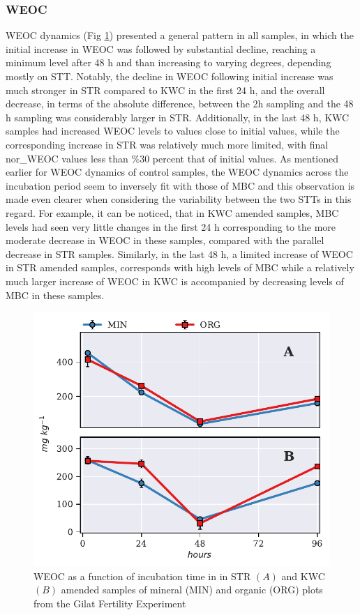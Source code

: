 		\subsubsection{WEOC}
			WEOC dynamics (Fig \ref{fig:weoc_treated_preliminary}) presented a general pattern in all samples, in which the initial increase in WEOC was followed by substantial decline, reaching a minimum level after 48 h and than increasing to varying degrees, depending mostly on STT.  Notably, the decline in WEOC following initial increase was much stronger in STR compared to KWC in the first 24 h, and the overall decrease, in terms of the absolute difference, between the 2h sampling and the 48 h sampling was considerably larger in STR. Additionally, in the last 48 h, KWC samples had increased WEOC levels to values close to initial values, while the corresponding increase in STR was relatively much more limited, with final nor\_WEOC values less than \%30 percent that of initial values. As mentioned earlier for WEOC dynamics of control samples, the WEOC dynamics across the incubation period seem to inversely fit with those of MBC and this observation is made even clearer when considering the variability between the two STTs in this regard. For example, it can be noticed, that in KWC amended samples, MBC levels had seen very little changes in the first 24 h corresponding to the more moderate decrease in WEOC in these samples, compared with the parallel  decrease in STR samples. Similarly, in the last 48 h, a limited increase of WEOC in STR amended samples, corresponds with high levels of MBC while a relatively much larger increase of WEOC in KWC is accompanied by decreasing levels of MBC in these samples.
			\begin{figure}[H]
				\centering
				\includegraphics[width=\linewidth]{thesis_figures/preliminary/treated/WEOC.pdf}
				\caption{WEOC  as a function of incubation time in in STR $\left(A\right)$ and KWC $\left(B\right)$ amended samples of mineral (MIN) and organic (ORG) plots from the Gilat Fertility Experiment}
				\label{fig:weoc_treated_preliminary}
			\end{figure}
